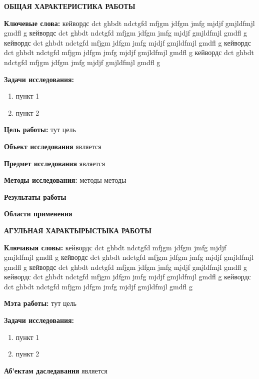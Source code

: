 \newpage
{}


\begin{center}
	\textbf{\large ОБЩАЯ ХАРАКТЕРИСТИКА РАБОТЫ}
\end{center}


\textbf{Ключевые слова:} кейвордс dct ghbdt ndctgfd mfjgm jdfgm jmfg mjdjf gmjldfmjl gmdfl g
кейвордс dct ghbdt ndctgfd mfjgm jdfgm jmfg mjdjf gmjldfmjl gmdfl g
кейвордс dct ghbdt ndctgfd mfjgm jdfgm jmfg mjdjf gmjldfmjl gmdfl g
кейвордс dct ghbdt ndctgfd mfjgm jdfgm jmfg mjdjf gmjldfmjl gmdfl g
кейвордс dct ghbdt ndctgfd mfjgm jdfgm jmfg mjdjf gmjldfmjl gmdfl g


\textbf{Задачи исследования:}
\begin{enumerate}
	\item пункт 1
	\item пункт 2
\end{enumerate}


\textbf{Цель работы:} тут цель


\textbf{Объект исследования} является


\textbf{Предмет исследования} является


\textbf{Методы исследования:} методы методы


\textbf{Результаты работы}


\textbf{Области применения}


\newpage
{}
\begin{center}
	\textbf{\large АГУЛЬНАЯ ХАРАКТЫРЫСТЫКА РАБОТЫ}
\end{center}

\textbf{Ключавыя словы:} кейвордс dct ghbdt ndctgfd mfjgm jdfgm jmfg mjdjf gmjldfmjl gmdfl g
кейвордс dct ghbdt ndctgfd mfjgm jdfgm jmfg mjdjf gmjldfmjl gmdfl g
кейвордс dct ghbdt ndctgfd mfjgm jdfgm jmfg mjdjf gmjldfmjl gmdfl g
кейвордс dct ghbdt ndctgfd mfjgm jdfgm jmfg mjdjf gmjldfmjl gmdfl g
кейвордс dct ghbdt ndctgfd mfjgm jdfgm jmfg mjdjf gmjldfmjl gmdfl g

\textbf{Мэта работы:} тут цель

\textbf{Задачи исследования:}
\begin{enumerate}
	\item пункт 1
	\item пункт 2
\end{enumerate}

\textbf{Аб’ектам даследавання} является


